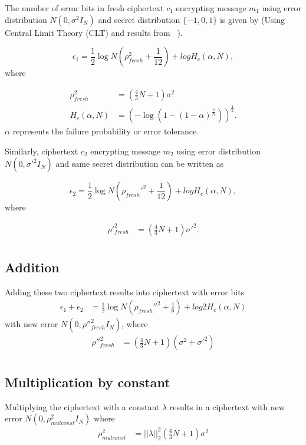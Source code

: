 \documentclass[a4paper,10pt]{article}
\begin{document}
The number of error bits in fresh ciphertext $c_1$ encrypting message $m_1$ using error 
distribution $N(0,\sigma^2 I_N)$ and secret distribution $\{-1,0,1\}$ is given by (Using Central Limit 
Theory (CLT) and results from~ \cite{costache2022precision}).

\begin{equation}
 \epsilon_1 = \frac{1}{2}\log N(\rho_{fresh}^2+\frac{1}{12}) + log H_c (\alpha,N),
\end{equation}
where

\begin{align*}
    \rho^2_{fresh} &= (\frac{4}{3}N+1)\sigma^2 \\
    H_c (\alpha,N) &= (-\log (1-(1-\alpha)^\frac{2}{N}))^\frac{1}{2}.
\end{align*}
$\alpha$  represents the failure probability or error tolerance.

Similarly, ciphertext $c_2$ encrypting message $m_2$ using error distribution $N(0,\sigma'^2 I_N)$ 
and same secret distribution can be written as

\begin{equation}
 \epsilon_2 = \frac{1}{2}\log N(\rho_{fresh}'^2+\frac{1}{12}) + log H_c (\alpha,N),
\end{equation}
where

\begin{align*}
    \rho'^2_{fresh}&=(\frac{4}{3}N+1)\sigma'^2. \\
\end{align*}

\subsection{Addition} 
Adding these two ciphertext results into ciphertext with error bits
\begin{align}
  \epsilon_1+\epsilon_2 &= \frac{1}{2}\log N(\rho_{fresh}''^2+\frac{1}{6}) + log 2H_c (\alpha,N)
\end{align}
with new error $N(0,\rho''^2_{fresh}I_N)$, where
\begin{align*}
    \rho''^2_{fresh}&=(\frac{4}{3}N+1)(\sigma^2+\sigma'^2) \\
\end{align*}

\subsection{Multiplication by constant} Multiplying the ciphertext with a constant $\lambda$
results in a ciphertext with new error $N(0,\rho_{mul const}^2I_N)$ where
\begin{align}
    \rho_{mul const}^2 &= ||\lambda||^2_2(\frac{4}{3}N+1)\sigma^2
\end{align}
\end{document}

